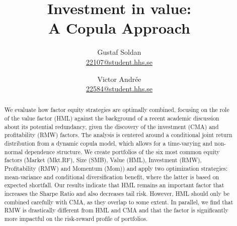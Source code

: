 
\begin{titlepage}
  \title{Investment in value:\\A Copula Approach}
  \author{
    Gustaf Soldan \\ \href{mailto:22107@student.hhs.se}{22107@student.hhs.se}\and
    Victor Andrée \\ \href{mailto:22584@student.hhs.se}{22584@student.hhs.se}
  }

  \maketitle

  \begin{abstract}
    \noindent We evaluate how factor equity strategies are optimally combined, focusing on the role of the value factor (HML) against the background of a recent academic discussion about its potential redundancy, given the discovery of the investment (CMA) and profitability (RMW) factors. The analysis is centered around a conditional joint return distribution from a dynamic copula model, which allows for a time-varying and non-normal dependence structure. We create portfolios of the six most common equity factors (Market (Mkt.RF), Size (SMB), Value (HML), Investment (RMW), Profitability (RMW) and Momentum (Mom)) and apply two optimization strategies: mean-variance and conditional diversification benefit, where the latter is based on expected shortfall. Our results indicate that HML remains an important factor that increases the Sharpe Ratio and also decreases tail risk. However, HML should only be combined carefully with CMA, as they overlap to some extent. In parallel, we find that RMW is drastically different from HML and CMA and that the factor is significantly more impactful on the risk-reward profile of portfolios.
  \end{abstract}

  \thispagestyle{empty}
\end{titlepage}
